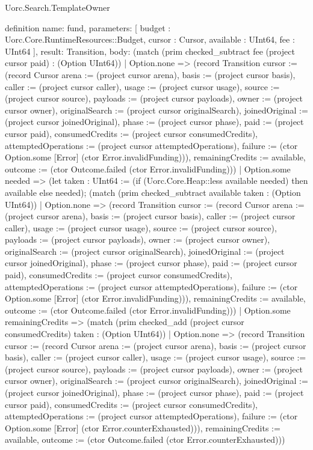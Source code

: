 \begin{lexlean}{Uorc.Search.TemplateOwner}
\begin{semanticmodule}
definition{
  name: fund,
  parameters: [
    budget : Uorc.Core.RuntimeResources::Budget,
    cursor : Cursor,
    available : UInt64,
    fee : UInt64
  ],
  result: Transition,
  body: (match (prim checked_subtract fee (project cursor paid) : (Option UInt64))
    | Option.none => (record Transition {cursor := (record Cursor {arena := (project cursor arena), basis := (project cursor basis), caller := (project cursor caller), usage := (project cursor usage), source := (project cursor source), payloads := (project cursor payloads), owner := (project cursor owner), originalSearch := (project cursor originalSearch), joinedOriginal := (project cursor joinedOriginal), phase := (project cursor phase), paid := (project cursor paid), consumedCredits := (project cursor consumedCredits), attemptedOperations := (project cursor attemptedOperations), failure := (ctor Option.some [Error] (ctor Error.invalidFunding))}), remainingCredits := available, outcome := (ctor Outcome.failed (ctor Error.invalidFunding))})
    | Option.some needed => (let taken : UInt64 := (if (Uorc.Core.Heap::less available needed) then available else needed); (match (prim checked_subtract available taken : (Option UInt64))
      | Option.none => (record Transition {cursor := (record Cursor {arena := (project cursor arena), basis := (project cursor basis), caller := (project cursor caller), usage := (project cursor usage), source := (project cursor source), payloads := (project cursor payloads), owner := (project cursor owner), originalSearch := (project cursor originalSearch), joinedOriginal := (project cursor joinedOriginal), phase := (project cursor phase), paid := (project cursor paid), consumedCredits := (project cursor consumedCredits), attemptedOperations := (project cursor attemptedOperations), failure := (ctor Option.some [Error] (ctor Error.invalidFunding))}), remainingCredits := available, outcome := (ctor Outcome.failed (ctor Error.invalidFunding))})
      | Option.some remainingCredits => (match (prim checked_add (project cursor consumedCredits) taken : (Option UInt64))
        | Option.none => (record Transition {cursor := (record Cursor {arena := (project cursor arena), basis := (project cursor basis), caller := (project cursor caller), usage := (project cursor usage), source := (project cursor source), payloads := (project cursor payloads), owner := (project cursor owner), originalSearch := (project cursor originalSearch), joinedOriginal := (project cursor joinedOriginal), phase := (project cursor phase), paid := (project cursor paid), consumedCredits := (project cursor consumedCredits), attemptedOperations := (project cursor attemptedOperations), failure := (ctor Option.some [Error] (ctor Error.counterExhausted))}), remainingCredits := available, outcome := (ctor Outcome.failed (ctor Error.counterExhausted))})
}
\end{semanticmodule}
\end{lexlean}
